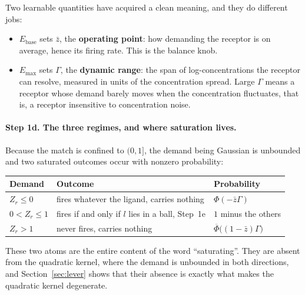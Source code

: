 \documentclass[11pt,a4paper]{article}
\newcommand{\Phibar}{\overline{\Phi}}
\newcommand{\Ebase}{E_{\mathrm{base}}}
\newcommand{\Emax}{E_{\mathrm{max}}}
\begin{document}
Two learnable quantities have acquired a clean meaning, and they do different jobs:
\begin{itemize}
  \item $\Ebase$ sets $\bar z$, the \textbf{operating point}: how demanding the receptor
    is on average, hence its firing rate. This is the balance knob.
  \item $\Emax$ sets $\Gamma$, the \textbf{dynamic range}: the span of
    log-concentrations the receptor can resolve, measured in units of the concentration
    spread. Large $\Gamma$ means a receptor whose demand barely moves when the
    concentration fluctuates, that is, a receptor insensitive to concentration noise.
\end{itemize}

\paragraph{Step 1d. The three regimes, and where saturation lives.} Because the match is
confined to $(0,1]$, the demand being Gaussian is unbounded and two saturated outcomes
occur with nonzero probability:
\begin{center}
\begin{tabular}{lll}
\toprule
Demand & Outcome & Probability \\
\midrule
$Z_r \le 0$ & fires whatever the ligand, carries nothing & $\Phi(-\bar z \Gamma)$ \\
$0 < Z_r \le 1$ & fires if and only if $l$ lies in a ball, Step~1e & $1$ minus the others \\
$Z_r > 1$ & never fires, carries nothing & $\Phibar\big((1-\bar z)\Gamma\big)$ \\
\bottomrule
\end{tabular}
\end{center}
These two atoms are the entire content of the word ``saturating''. They are absent from
the quadratic kernel, where the demand is unbounded in both directions, and
Section~\ref{sec:lever} shows that their absence is exactly what makes the quadratic
kernel degenerate.
\end{document}
